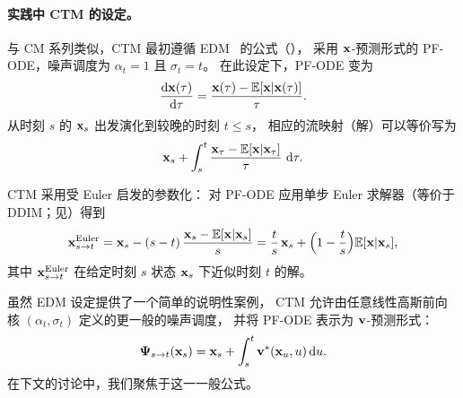 \paragraph{实践中 CTM 的设定。}
与 CM 系列类似，CTM 最初遵循 EDM~\citep{karras2022elucidating} 的公式（），
采用 ${\mathbf{x}}$-预测形式的 PF-ODE，噪声调度为
$\alpha_t = 1$ 且 $\sigma_t = t$。
在此设定下，PF-ODE 变为
\begin{align*}
    \frac{\mathop{}\!\mathrm{d} {\mathbf{x}}(\tau)}{\mathop{}\!\mathrm{d} \tau}
    = \frac{{\mathbf{x}}(\tau) - \mathbb{E}[{\mathbf{x}}|{\mathbf{x}}(\tau)]}{\tau}.
\end{align*}
从时刻 $s$ 的 ${\mathbf{x}}_s$ 出发演化到较晚的时刻 $t \le s$，
相应的流映射（解）可以等价写为
\begin{align*}
{\mathbf{x}}_s + \int_s^t
    \frac{{\mathbf{x}}_\tau - \mathbb{E}[{\mathbf{x}} |{\mathbf{x}}_\tau]}{\tau}\, \mathop{}\!\mathrm{d} \tau.
\end{align*}

CTM 采用受 Euler 启发的参数化：
对 PF-ODE 应用单步 Euler 求解器（等价于 DDIM；见）得到
\[
{\mathbf{x}}_{s\to t}^{\mathrm{Euler}}
= {\mathbf{x}}_s - (s-t)\,\frac{{\mathbf{x}}_s - \mathbb{E}[{\mathbf{x}}|{\mathbf{x}}_s]}{s}
= \frac{t}{s}\,{\mathbf{x}}_s + \Big(1 - \frac{t}{s}\Big)\mathbb{E}[{\mathbf{x}}|{\mathbf{x}}_s],
\]
其中 ${\mathbf{x}}_{s\to t}^{\mathrm{Euler}}$ 在给定时刻 $s$ 状态 ${\mathbf{x}}_s$ 下近似时刻 $t$ 的解。

虽然 EDM 设定提供了一个简单的说明性案例，
CTM 允许由任意线性高斯前向核 $(\alpha_t, \sigma_t)$ 定义的更一般的噪声调度，
并将 PF-ODE 表示为 ${\mathbf{v}}$-预测形式：
\[
{\bm{\Psi}}_{s\to t}({\mathbf{x}}_s)
= {\mathbf{x}}_s + \int_s^t {\mathbf{v}}^*({\mathbf{x}}_u,u) \mathop{}\!\mathrm{d} u.
\]
在下文的讨论中，我们聚焦于这一一般公式。


